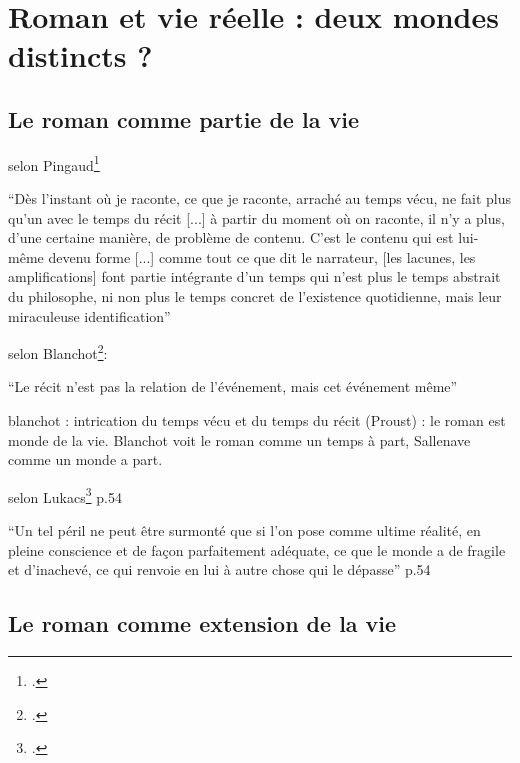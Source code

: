 \documentclass[a4paper,10pt]{article}
\begin{document}
	\section{Roman et vie réelle : deux mondes distincts ?}
		\subsection{Le roman comme partie de la vie}
			selon Pingaud\footcite{Pingaud1992}
			\begin{center}
				\footnotesize
				\begin{minipage}{0.7\textwidth}
					``Dès l'instant où je raconte, ce que je raconte, arraché au temps vécu, ne fait plus qu'un avec le temps du récit [...] à partir du moment où on raconte, il n'y a plus, d'une certaine manière, de problème de contenu. C'est le contenu qui est lui-même devenu forme [...] comme tout ce que dit le narrateur, [les lacunes, les amplifications] font partie intégrante d'un temps qui n'est plus le temps abstrait du philosophe, ni non plus le temps concret de l'existence quotidienne, mais leur miraculeuse identification''
				\end{minipage}
			\end{center}
			selon Blanchot\footcite{Blanchot1959}:
			\begin{center}
				\footnotesize
				\begin{minipage}{0.7\textwidth}
					``Le récit n'est pas la relation de l'événement, mais cet événement même''
				\end{minipage}
			\end{center}
			blanchot : intrication du temps vécu et du temps du récit (Proust) : le roman est monde de la vie.
			Blanchot voit le roman comme un temps à part, Sallenave comme un monde a part.
			
			
			
			selon Lukacs\footcite{Lukacs1916} p.54
			\begin{center}
				\footnotesize
				\begin{minipage}{0.7\textwidth}
					``Un tel péril ne peut être surmonté que si l'on pose comme ultime réalité, en pleine conscience et de façon parfaitement adéquate, ce que le monde a de fragile et d'inachevé, ce qui renvoie en lui à autre chose qui le dépasse'' p.54
				\end{minipage}
			\end{center}
		\subsection{Le roman comme extension de la vie}
		
\end{document}
